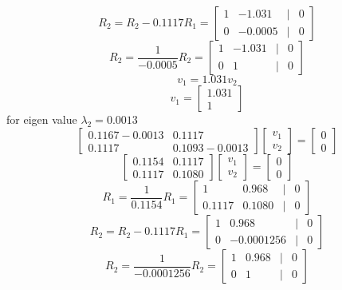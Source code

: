 \documentclass[a3paper,12pt]{extarticle} %
\begin{document}
\begin{enumerate}
\begin{enumerate}
\[        \]
        \[
            R_2 = R_2 - 0.1117R_1 = \begin{bmatrix}1 & -1.031 & | & 0\\0 & -0.0005 & | & 0\end{bmatrix}
        \]
        \[
        R_2 = \frac{1}{-0.0005}R_2 = \begin{bmatrix}1 & -1.031 & | & 0\\0 & 1 & | & 0\end{bmatrix}
        \]
        \[
        v_1 = 1.031v_2
        \]
        \[
        v_1 = \begin{bmatrix}1.031\\1\end{bmatrix}
        \]
        for eigen value \(\lambda_2 = 0.0013\)
        \[
            \begin{bmatrix}0.1167 - 0.0013 & 0.1117\\0.1117 & 0.1093 - 0.0013\end{bmatrix} \begin{bmatrix}v_1\\v_2\end{bmatrix} = \begin{bmatrix}0\\0\end{bmatrix}
        \]
        \[
            \begin{bmatrix}0.1154 & 0.1117\\0.1117 & 0.1080\end{bmatrix} \begin{bmatrix}v_1\\v_2\end{bmatrix} = \begin{bmatrix}0\\0\end{bmatrix}
        \]
        \[
            R_1 = \frac{1}{0.1154}R_1 = \begin{bmatrix}1 & 0.968 & | & 0\\0.1117 & 0.1080 & | & 0\end{bmatrix}
        \]
        \[
            R_2 = R_2 - 0.1117R_1 = \begin{bmatrix}1 & 0.968 & | & 0\\0 & -0.0001256 & | & 0\end{bmatrix}
        \]
        \[
        R_2 = \frac{1}{-0.0001256}R_2 = \begin{bmatrix}1 & 0.968 & | & 0\\0 & 1 & | & 0\end{bmatrix}
        \]
        \[
\]
\end{enumerate}
\end{enumerate}
\end{document}
